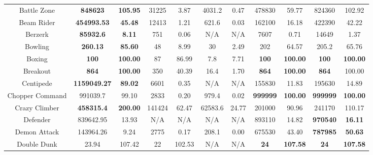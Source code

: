 \documentclass[nohyperref]{article}
\newcommand{\best}[1]{\textbf{#1}}
\theoremstyle{plain}
\begin{document}
\begin{table}[!hb]
\begin{center}
\begin{tabular}{|c |c c| c c| c c| c c| c c| }
 Battle Zone        & \textbf{848623         }& \textbf{105.95}      &31225      & 3.87     &4031.2    & 0.47       & 478830                    &  59.77        &824360            &102.92  \\
 Beam Rider         & \textbf{454993.53}      & \textbf{45.48}      &12413      & 1.21     &621.6     & 0.03    & 162100                        &  16.18        &422390            &42.22  \\
 Berzerk            & \textbf{85932.6        }& \textbf{8.11}      &751        & 0.06     &N/A       & N/A     & 7607                           &  0.71         &14649             &1.37  \\
 Bowling            & \textbf{260.13         }& \textbf{85.60}      &48         & 8.99     &30        & 2.49    & 202                           &  64.57        &205.2             &65.76 \\
 Boxing             & \textbf{100}                     & \textbf{100.00}       &87                  & 86.99       &7.8         & 7.71       & \best{100}          & \best{100.00 }&\textbf{100}       &\textbf{100.00}\\
 Breakout           & \textbf{864}                     & \textbf{100.00}          &350                 & 40.39       &16.4     & 1.70       & \best{864}          & \best{100.00} &\textbf{864}     &100.00\\
 Centipede          & \textbf{1159049.27}     & \textbf{89.02}     &6601       & 0.35     &N/A       & N/A     & 155830                         & 11.83         &195630    &14.89\\
 Chopper Command    & 991039.7                & 99.10     &2833                & 0.20     & 979.4             & 0.02    & \best{999999}         & \best{100.00} &\textbf{999999}    &\textbf{100.00}\\
 Crazy Climber      & \textbf{458315.4}       & \textbf{200.00    }  &141424     & 62.47       & 62583.6  & 24.77   & 201000                    & 90.96         &241170    &110.17\\
 Defender           & 839642.95               & 13.93      & N/A                & N/A        & N/A               & N/A      & 893110     &14.82  &\textbf{970540}    &\textbf{16.11}\\
 Demon Attack       & 143964.26               & 9.24      & 2775              &0.17      & 208.1             & 0.00    & 675530         & 43.40  &\textbf{787985}   &\textbf{50.63}\\
 Double Dunk        & 23.94          & 107.42     & 22        &102.53        & N/A      & N/A                                               & \textbf{24}& \textbf{107.58} &\textbf{24}&\textbf{107.58} \\

\end{tabular}
\end{center}
\end{table}
\end{document}
